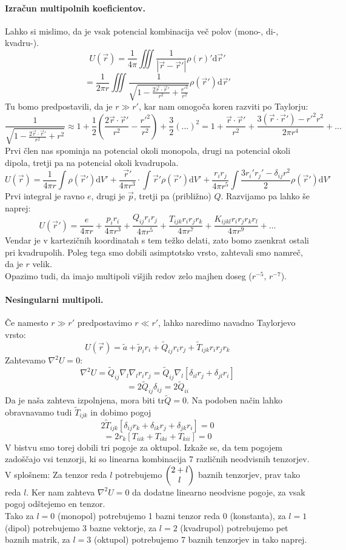 \documentclass[a4paper]{article}
\newcommand{\vct}[1]{\overrightarrow{#1}}
\newcommand{\dif}{\mathrm{d}}
\newcommand{\Binom}[2]{\begin{pmatrix} {#1} \cr {#2} \end{pmatrix}}
\begin{document}
\paragraph{Izračun multipolnih koeficientov.} Lahko si mislimo, da je vsak potencial kombinacija več polov (mono-, di-, kvadru-).
$$U(\vct{r}) = \frac{1}{4\pi}\iiint \frac{1}{\left|\vct{r} - \vct{r}'\right|}\rho(r)'\dif\vct{r}'$$
$$= \frac{1}{2\pi r} \iiint \frac{1}{\sqrt{1 - \frac{2\vct{r}\cdot\vct{r}'}{r^2} + \frac{r'^2}{r^2}}}\rho(\vct{r}')\dif\vct{r}'$$
Tu bomo predpostavili, da je $r \gg r'$, kar nam omogoča koren razviti po Taylorju:
$$\frac{1}{\sqrt{1 - \frac{2\vct{r}\cdot\vct{r}'}{r^2} + r^2}} \approx 1 + \frac{1}{2}\left(\frac{2\vct{r}\cdot\vct{r}'}{r^2} - \frac{r'^2}{r^2}\right) + \frac{3}{2}\left(...\right)^2 = 1 + \frac{\vct{r}\cdot\vct{r}'}{r^2} + \frac{3(\vct{r}\cdot\vct{r}') - r'^2r^2}{2\pi r^4} + ...$$
Prvi člen nas spominja na potencial okoli monopola, drugi na potencial okoli dipola, tretji pa na potencial okoli kvadrupola.
$$U(\vct{r}) = \frac{1}{4\pi r} \int \rho(\vct{r}')\dif V' + \frac{\vct{r}'}{4\pi r^3} \cdot \int \vct{r}'\rho(\vct{r}')\dif V' + \frac{r_ir_j}{4\pi r^5}\int \frac{3r_i'r_j' - \delta_{ij}r^2}{2}\rho(\vct{r}')\dif V'$$
Prvi integral je ravno $e$, drugi je $\vct{p}$, tretji pa (približno) $Q$. Razvijamo pa lahko še naprej:
$$U(\vct{r}') = \frac{e}{4\pi r} + \frac{p_ir_i}{4\pi r^3} + \frac{Q_{ij}r_ir_j}{4\pi r^5} + \frac{T_{ijk}r_ir_jr_k}{4\pi r^7} + \frac{K_{ijkl}r_ir_jr_kr_l}{4\pi r^9} + ...$$
Vendar je v kartezičnih koordinatah s tem težko delati, zato bomo zaenkrat ostali pri kvadrupolih.
Poleg tega smo dobili asimptotsko vrsto, zahtevali smo namreč, da je $r$ velik. \\
Opazimo tudi, da imajo multipoli višjih redov zelo majhen doseg ($r^{-5},\,r^{-7}$).
\paragraph{Nesingularni multipoli.} Če namesto $r \gg r'$ predpostavimo $r \ll r'$, lahko naredimo navadno Taylorjevo vrsto:
$$U(\vct{r}) = \tilde{a} + \tilde{p}_ir_i + \tilde{Q}_{ij}r_ir_j + \tilde{T}_{ijk}r_ir_jr_k$$
Zahtevamo $\nabla^2U = 0$:
$$\nabla^2U = \tilde{Q}_{ij}\nabla_l\nabla_lr_ir_j = \tilde{Q}_{ij} \nabla_l\left[\delta_{il}r_j + \delta_{jl}r_i\right]$$
$$ = 2\tilde{Q}_{ij}\delta_{ij} = 2\tilde{Q}_{ii}$$
Da je naša zahteva izpolnjena, mora biti tr$\tilde{Q} = 0$.
Na podoben način lahko obravnavamo tudi $\tilde{T}_{ijk}$ in dobimo pogoj
$$2\tilde{T}_{ijk}\left[\delta_{ij}r_k + \delta_{ik}r_j + \delta_{jk}r_i\right] = 0$$
$$= 2r_k\left[T_{iik} + T_{iki} + T_{kii}\right] = 0$$
V bistvu smo torej dobili tri pogoje za oktupol. Izkaže se, da tem pogojem zadoščajo vsi tenzorji, ki so linearna kombinacija 7 različnih neodvisnih tenzorjev. \\[2mm]
V splošnem: Za tenzor reda $l$ potrebujemo $\displaystyle{\Binom{2+l}{l}}$ baznih tenzorjev, prav tako reda $l$. Ker nam zahteva $\nabla^2U = 0$ da dodatne linearno neodvisne pogoje, za vsak pogoj odštejemo en tenzor. \\[2mm]
Tako za $l=0$ (monopol) potrebujemo 1 bazni tenzor reda 0 (konstanta),
za $l=1$ (dipol) potrebujemo 3 bazne vektorje, za $l=2$ (kvadrupol) potrebujemo pet baznih matrik, za $l=3$ (oktupol) potrebujemo 7 baznih tenzorjev in tako naprej.
\end{document}
